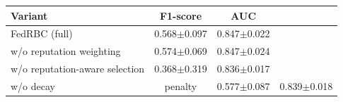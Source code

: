 \begin{tabular}{lcc}
\toprule
Variant & F1-score & AUC \\
\midrule
FedRBC (full) & 0.568$\pm$0.097 & 0.847$\pm$0.022 \\
w/o reputation weighting & 0.574$\pm$0.069 & 0.847$\pm$0.024 \\
w/o reputation-aware selection & 0.368$\pm$0.319 & 0.836$\pm$0.017 \\
w/o decay & penalty & 0.577$\pm$0.087 & 0.839$\pm$0.018 \\
\bottomrule
\end{tabular}
